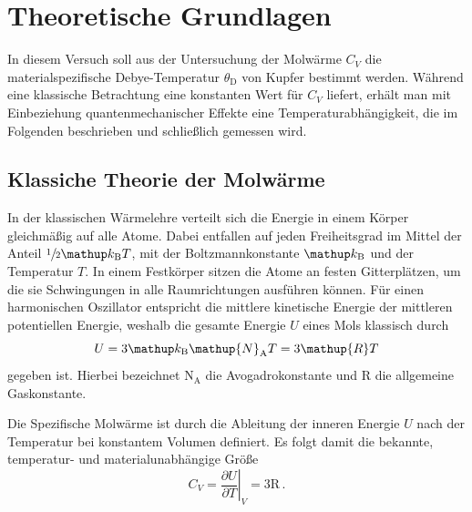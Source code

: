\section{Theoretische Grundlagen}
\label{sec:theorie}
In diesem Versuch soll aus der Untersuchung der Molwärme $C_V$
die materialspezifische Debye-Temperatur $\theta_\text{D}$ von Kupfer
bestimmt werden.
Während eine klassische Betrachtung eine konstanten Wert für $C_V$
liefert, erhält man mit Einbeziehung quantenmechanischer Effekte eine
Temperaturabhängigkeit, die im Folgenden beschrieben und schließlich 
gemessen wird.

\subsection{Klassiche Theorie der Molwärme}
\label{subsec:klassisch}
In der klassischen Wärmelehre verteilt sich die Energie in einem Körper
gleichmäßig auf alle Atome. Dabei entfallen auf jeden Freiheitsgrad im Mittel
der Anteil $\sfrac{1}{2}\kb T$, mit der Boltzmannkonstante $\kb$ und der
Temperatur $T$.
In einem Festkörper sitzen die Atome an festen Gitterplätzen, um die sie
Schwingungen in alle Raumrichtungen ausführen können. Für einen harmonischen
Oszillator entspricht die mittlere kinetische Energie der mittleren
potentiellen Energie, weshalb die gesamte Energie $U$ eines Mols klassisch
durch
\begin{equation}
    \label{eqn:innere_energie}
    U = 3 \kb \mathup{N}_\text{A} T = 3\mathup{R}T
\end{equation}
gegeben ist. Hierbei bezeichnet $\mathup{N}_\text{A}$ die Avogadrokonstante
und $\mathup{R}$ die allgemeine Gaskonstante.

Die Spezifische Molwärme ist durch die Ableitung der inneren Energie $U$ nach
der Temperatur bei konstantem Volumen definiert. Es folgt damit
die bekannte, temperatur- und materialunabhängige Größe
\begin{equation}
    \label{eqn:cv_klassisch}
    C_V = \left.\frac{\partial U}{\partial T}\right|_V = 3 \mathup{R}\,.
\end{equation}

